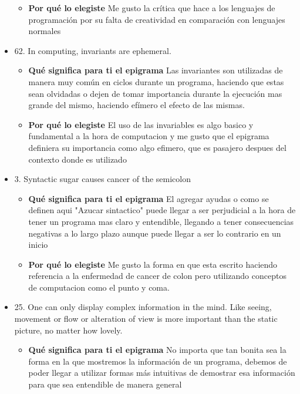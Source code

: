 \documentclass{article}
\begin{document}
\begin{itemize}
\begin{itemize}
            \item \textbf{ Por qué lo elegiste}
            \newline Me gusto la crítica que hace a los lenguajes de programación por su falta de creatividad en comparación con lenguajes normales 

        \end{itemize}
    \item 62. In computing, invariants are ephemeral.
            \begin{itemize}
            \item \textbf{ Qué significa para ti el epigrama} 
                \newline Las invariantes son utilizadas de manera muy común en ciclos durante un programa, haciendo que estas sean olvidadas o dejen de tomar importancia durante la ejecución mas grande del mismo, haciendo efímero el efecto de las mismas.
            
                
            \item \textbf{ Por qué lo elegiste}
            \newline El uso de las invariables es algo basico y fundamental a la hora de computacion y me gusto que el epigrama definiera su importancia como algo efimero, que es pasajero despues del contexto donde es utilizado
        \end{itemize}
    \item 3. Syntactic sugar causes cancer of the semicolon
            \begin{itemize}
            \item \textbf{ Qué significa para ti el epigrama} 
            \newline El agregar ayudas o como se definen aqui "Azucar sintactico" puede llegar a ser perjudicial a la hora de tener un programa mas claro y entendible, llegando a tener consecuencias negativas a lo largo plazo aunque puede llegar a ser lo contrario en un inicio
                
            \item \textbf{ Por qué lo elegiste}
            \newline Me gusto la forma en que esta escrito haciendo referencia a la enfermedad de cancer de colon pero utilizando conceptos de computacion como el punto y coma. 


            
        \end{itemize}
    \item 25. One can only display complex information in the mind. Like seeing, movement or flow or alteration of view is more important than the static picture, no matter how lovely.
            \begin{itemize}
            \item \textbf{ Qué significa para ti el epigrama} 
                \newline No importa que tan bonita sea la forma en la que mostremos la información de un programa, debemos de poder llegar a utilizar formas más intuitivas de demostrar esa información para que sea entendible de manera general
            

\end{itemize}
\end{itemize}
\end{document}
